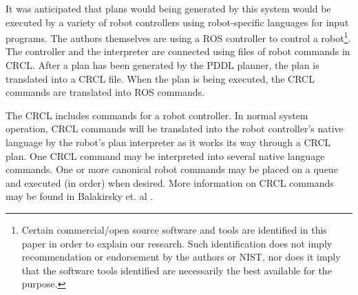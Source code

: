 It was anticipated
that plans would being generated by this system would
be executed by a variety of robot controllers using
robot-specific languages for input programs. The authors themselves are
using a ROS controller \cite{ROS} to control a 
robot\footnote{Certain commercial/open source software and tools are identified
in this paper in order to explain our research. Such identification does not imply
recommendation or endorsement by the authors or NIST, nor does it
imply that the software tools identified are necessarily the best available for the purpose.}. 
The controller and the interpreter are connected using files of robot commands in CRCL. After a plan
has been generated by the PDDL planner, the plan is translated into a CRCL
file. When the plan is being executed, the CRCL commands are translated
into ROS commands.

The CRCL includes commands for a robot controller. In normal system operation,
CRCL commands will be translated into the robot controller's native
language by the robot's plan interpreter as it works its way through a
CRCL plan. One CRCL command may be interpreted into several native
language commands.
One or more canonical robot commands may be placed on a queue and
executed (in order) when desired. 
More information on CRCL commands may be found in
Balakirsky et. al \cite{Balakirsky2012-1}.
